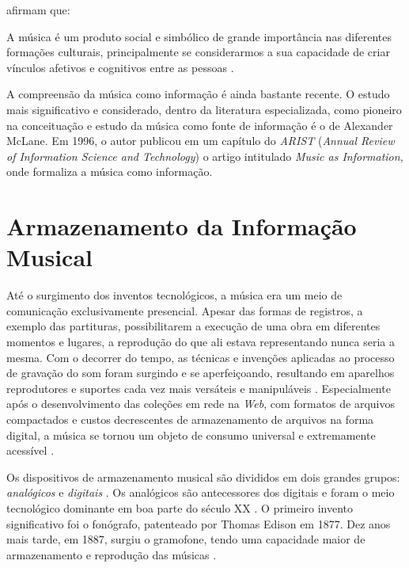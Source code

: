  afirmam que:

\begin{citacao}
A música é um produto social e simbólico de grande importância nas diferentes formações culturais, principalmente se considerarmos a sua capacidade de criar vínculos afetivos e cognitivos entre as pessoas \cite{lima&santini2006}.
\end{citacao}

A compreensão da música como informação é ainda bastante recente. O estudo mais significativo e considerado, dentro da literatura especializada, como pioneiro na conceituação e estudo da música como fonte de informação é o de Alexander McLane. Em 1996, o autor publicou em um capítulo do \textit{ARIST} (\textit{Annual Review of Information Science and Technology}) o artigo intitulado \textit{Music as Information}, onde formaliza a música como informação.

\section{Armazenamento da Informação Musical}

Até o surgimento dos inventos tecnológicos, a música era um meio de comunicação exclusivamente presencial. Apesar das formas de registros, a exemplo das partituras, possibilitarem a execução de uma obra em diferentes momentos e lugares, a reprodução do que ali estava representando nunca seria a mesma. Com o decorrer do tempo,  as técnicas e invenções aplicadas ao processo de gravação do som foram surgindo e se aperfeiçoando, resultando em aparelhos reprodutores e suportes cada vez mais versáteis e manipuláveis \cite{daquino2012}. Especialmente após o desenvolvimento das coleções em rede na \textit{Web}, com formatos de arquivos compactados e custos decrescentes de armazenamento de arquivos na forma digital, a música se tornou um objeto de consumo universal e extremamente acessível \cite{gomes2015}.

Os dispositivos de armazenamento musical são divididos em dois grandes grupos: \textit{analógicos} e \textit{digitais} \cite{andrade&crispim2008}. Os analógicos são antecessores dos digitais e foram o meio tecnológico dominante em boa parte do século XX \cite{paulozuben2004}. O primeiro invento significativo foi o fonógrafo, patenteado por Thomas Edison em 1877. Dez anos mais tarde, em 1887, surgiu o gramofone, tendo uma capacidade maior de armazenamento e reprodução das músicas \cite{marchi2005}. 


